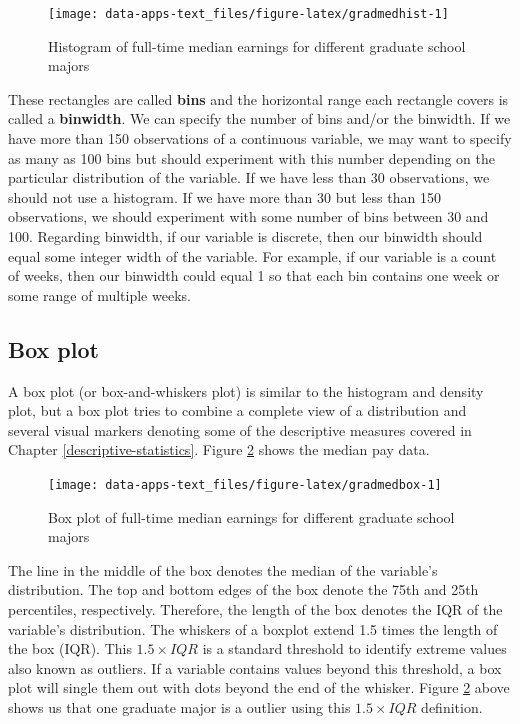 \documentclass[
]{book}
\begin{document}
\begin{figure}

{\centering \texttt{[image: data-apps-text\_files/figure-latex/gradmedhist-1]} 

}

\caption{Histogram of full-time median earnings for different graduate school majors}\label{fig:gradmedhist}
\end{figure}

These rectangles are called \textbf{bins} and the horizontal range each rectangle covers is called a \textbf{binwidth}. We can specify the number of bins and/or the binwidth. If we have more than 150 observations of a continuous variable, we may want to specify as many as 100 bins but should experiment with this number depending on the particular distribution of the variable. If we have less than 30 observations, we should not use a histogram. If we have more than 30 but less than 150 observations, we should experiment with some number of bins between 30 and 100. Regarding binwidth, if our variable is discrete, then our binwidth should equal some integer width of the variable. For example, if our variable is a count of weeks, then our binwidth could equal 1 so that each bin contains one week or some range of multiple weeks.

\hypertarget{box-plot}{%
\subsection{Box plot}\label{box-plot}}

A box plot (or box-and-whiskers plot) is similar to the histogram and density plot, but a box plot tries to combine a complete view of a distribution and several visual markers denoting some of the descriptive measures covered in Chapter \ref{descriptive-statistics}. Figure \ref{fig:gradmedbox} shows the median pay data.

\begin{figure}

{\centering \texttt{[image: data-apps-text\_files/figure-latex/gradmedbox-1]} 

}

\caption{Box plot of full-time median earnings for different graduate school majors}\label{fig:gradmedbox}
\end{figure}

The line in the middle of the box denotes the median of the variable's distribution. The top and bottom edges of the box denote the 75th and 25th percentiles, respectively. Therefore, the length of the box denotes the IQR of the variable's distribution. The whiskers of a boxplot extend 1.5 times the length of the box (IQR). This \(1.5 \times IQR\) is a standard threshold to identify extreme values also known as outliers. If a variable contains values beyond this threshold, a box plot will single them out with dots beyond the end of the whisker. Figure \ref{fig:gradmedbox} above shows us that one graduate major is a outlier using this \(1.5 \times IQR\) definition.
\end{document}
